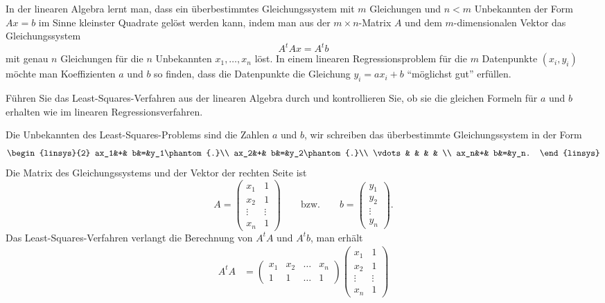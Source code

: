 In der linearen Algebra lernt man, dass ein überbestimmtes Gleichungssystem
mit $m$ Gleichungen und $n<m$ Unbekannten der Form $Ax=b$ im Sinne kleinster Quadrate
gelöst werden kann, indem man aus der $m\times n$-Matrix $A$ und dem 
$m$-dimensionalen Vektor das Gleichungssystem
\[
A^tA x= A^tb
\]
mit genau $n$ Gleichungen für die $n$ Unbekannten $x_1,\dots,x_n$ löst.
In einem linearen Regressionsproblem für die $m$ Datenpunkte $(x_i,y_i)$
möchte man Koeffizienten $a$ und $b$ so finden, dass die Datenpunkte
die Gleichung $y_i=ax_i+b$ ``möglichst gut'' erfüllen.

Führen Sie das Least-Squares-Verfahren aus der linearen Algebra durch und
kontrollieren Sie, ob sie die gleichen Formeln für $a$ und $b$ erhalten
wie im linearen Regressionsverfahren.

\begin{loesung}
Die Unbekannten des Least-Squares-Problems sind die Zahlen $a$ und $b$,
wir schreiben das überbestimmte Gleichungssystem in der Form
\[
\begin{linsys}{2}
  ax_1&+&     b&=&y_1\phantom{.}\\
  ax_2&+&     b&=&y_2\phantom{.}\\
\vdots& &      & &   \\
  ax_n&+&     b&=&y_n.
\end{linsys}
\]
Die Matrix des Gleichungssystems und der Vektor der rechten Seite ist 
\[
A=
\begin{pmatrix}
x_1&1\\
x_2&1\\
\vdots&\vdots\\
x_n&1
\end{pmatrix}
\qquad
\text{bzw.}
\qquad
b=\begin{pmatrix}
y_1\\
y_2\\
\vdots\\
y_n
\end{pmatrix}.
\]
Das Least-Squares-Verfahren verlangt die Berechnung von $A^tA$ und $A^tb$,
man erhält
\[
\begin{aligned}
A^tA
&=\begin{pmatrix}
x_1&x_2&\dots&x_n\\
  1&  1&\dots&1
\end{pmatrix}
\begin{pmatrix}
x_1&1\\
x_2&1\\
\vdots&\vdots\\
x_n&1
\end{pmatrix}

\end{aligned}\]
\end{loesung}
